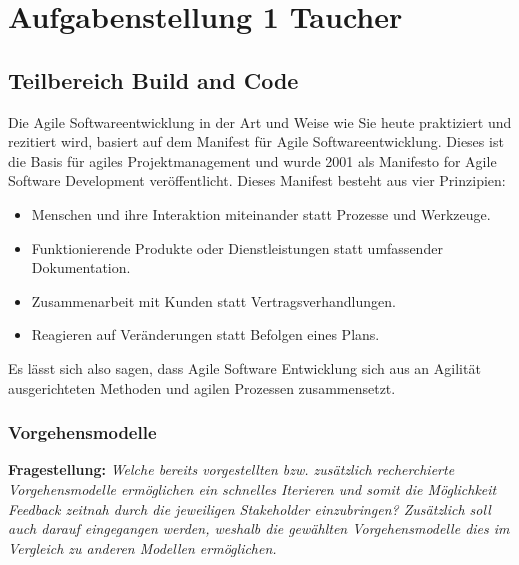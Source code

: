 \newpage
\section{Aufgabenstellung 1 Taucher}

                      


\subsection{Teilbereich Build and Code}
Die Agile Softwareentwicklung in der Art und Weise wie Sie heute praktiziert und rezitiert wird, basiert auf 
dem Manifest für Agile Softwareentwicklung. Dieses ist die Basis für agiles Projektmanagement und wurde
2001 als Manifesto for Agile Software Development veröffentlicht. Dieses Manifest besteht aus vier Prinzipien:
\begin{itemize}
    \item Menschen und ihre Interaktion miteinander statt Prozesse und Werkzeuge.
    \item Funktionierende Produkte oder Dienstleistungen statt umfassender Dokumentation.
    \item Zusammenarbeit mit Kunden statt Vertragsverhandlungen.
    \item Reagieren auf Veränderungen statt Befolgen eines Plans. \cite{agile-manifesto}
\end{itemize} 
  
Es lässt sich also sagen, dass Agile Software Entwicklung sich aus an Agilität ausgerichteten
Methoden und agilen Prozessen zusammensetzt. 

\subsubsection{Vorgehensmodelle}
\textbf{Fragestellung:} \textit{Welche bereits vorgestellten bzw. zusätzlich recherchierte Vorgehensmodelle ermöglichen ein
schnelles Iterieren und somit die Möglichkeit Feedback zeitnah durch die jeweiligen Stakeholder
einzubringen? Zusätzlich soll auch darauf eingegangen werden, weshalb die gewählten
Vorgehensmodelle dies im Vergleich zu anderen Modellen ermöglichen.}
\\

